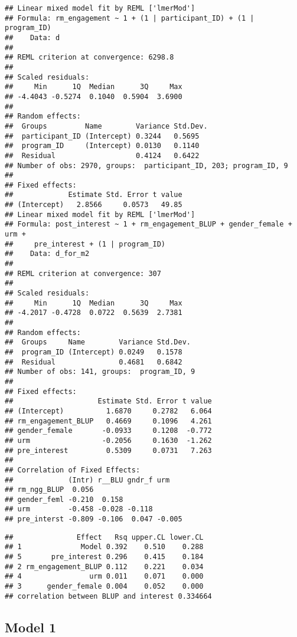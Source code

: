 \documentclass[man]{apa6}
\theoremstyle{definition}
\theoremstyle{definition}
\theoremstyle{definition}
\theoremstyle{remark}
\begin{document}
\begin{verbatim}
## Linear mixed model fit by REML ['lmerMod']
## Formula: rm_engagement ~ 1 + (1 | participant_ID) + (1 | program_ID)
##    Data: d
## 
## REML criterion at convergence: 6298.8
## 
## Scaled residuals: 
##     Min      1Q  Median      3Q     Max 
## -4.4043 -0.5274  0.1040  0.5904  3.6900 
## 
## Random effects:
##  Groups         Name        Variance Std.Dev.
##  participant_ID (Intercept) 0.3244   0.5695  
##  program_ID     (Intercept) 0.0130   0.1140  
##  Residual                   0.4124   0.6422  
## Number of obs: 2970, groups:  participant_ID, 203; program_ID, 9
## 
## Fixed effects:
##             Estimate Std. Error t value
## (Intercept)   2.8566     0.0573   49.85
## Linear mixed model fit by REML ['lmerMod']
## Formula: post_interest ~ 1 + rm_engagement_BLUP + gender_female + urm +  
##     pre_interest + (1 | program_ID)
##    Data: d_for_m2
## 
## REML criterion at convergence: 307
## 
## Scaled residuals: 
##     Min      1Q  Median      3Q     Max 
## -4.2017 -0.4728  0.0722  0.5639  2.7381 
## 
## Random effects:
##  Groups     Name        Variance Std.Dev.
##  program_ID (Intercept) 0.0249   0.1578  
##  Residual               0.4681   0.6842  
## Number of obs: 141, groups:  program_ID, 9
## 
## Fixed effects:
##                    Estimate Std. Error t value
## (Intercept)          1.6870     0.2782   6.064
## rm_engagement_BLUP   0.4669     0.1096   4.261
## gender_female       -0.0933     0.1208  -0.772
## urm                 -0.2056     0.1630  -1.262
## pre_interest         0.5309     0.0731   7.263
## 
## Correlation of Fixed Effects:
##             (Intr) r__BLU gndr_f urm   
## rm_ngg_BLUP  0.056                     
## gender_feml -0.210  0.158              
## urm         -0.458 -0.028 -0.118       
## pre_interst -0.809 -0.106  0.047 -0.005
\end{verbatim}

\begin{verbatim}
##               Effect   Rsq upper.CL lower.CL
## 1              Model 0.392    0.510    0.288
## 5       pre_interest 0.296    0.415    0.184
## 2 rm_engagement_BLUP 0.112    0.221    0.034
## 4                urm 0.011    0.071    0.000
## 3      gender_female 0.004    0.052    0.000
## correlation between BLUP and interest 0.334664
\end{verbatim}

\subsection{Model 1}\label{model-1}
\end{document}
